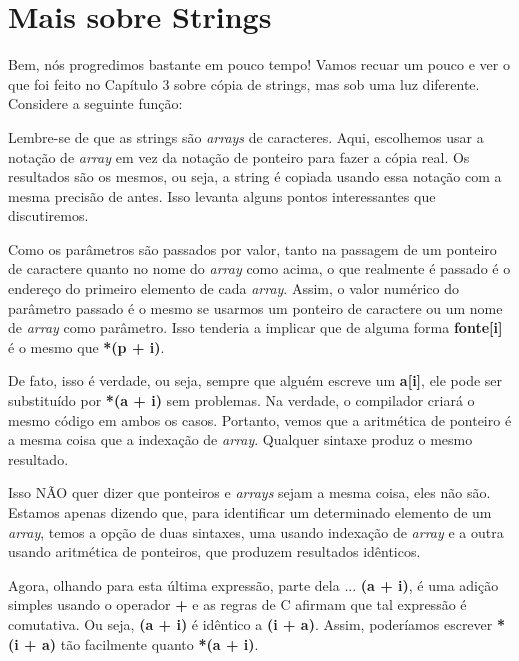 
\chapter{Mais sobre Strings}
Bem, nós progredimos bastante em pouco tempo! Vamos recuar um pouco e ver o que foi feito no Capítulo 3 sobre cópia de strings, mas sob uma luz diferente. Considere a seguinte função:


Lembre-se de que as strings são \textit{arrays} de caracteres. Aqui, escolhemos usar a notação de \textit{array} em vez da notação de ponteiro para fazer a cópia real. Os resultados são os mesmos, ou seja, a string é copiada usando essa notação com a mesma precisão de antes. Isso levanta alguns pontos interessantes que discutiremos.

Como os parâmetros são passados por valor, tanto na passagem de um ponteiro de caractere quanto no nome do \textit{array} como acima, o que realmente é passado é o endereço do primeiro elemento de cada \textit{array}. Assim, o valor numérico do parâmetro passado é o mesmo se usarmos um ponteiro de caractere ou um nome de \textit{array} como parâmetro. Isso tenderia a implicar que de alguma forma \textbf{fonte[i]} é o mesmo que \textbf{*(p + i)}.

De fato, isso é verdade, ou seja, sempre que alguém escreve um \textbf{a[i]}, ele pode ser substituído por \textbf{*(a + i)} sem problemas. Na verdade, o compilador criará o mesmo código em ambos os casos. Portanto, vemos que a aritmética de ponteiro é a mesma coisa que a indexação de \textit{array}. Qualquer sintaxe produz o mesmo resultado.

Isso NÃO quer dizer que ponteiros e \textit{arrays} sejam a mesma coisa, eles não são. Estamos apenas dizendo que, para identificar um determinado elemento de um \textit{array}, temos a opção de duas sintaxes, uma usando indexação de \textit{array} e a outra usando aritmética de ponteiros, que produzem resultados idênticos.

Agora, olhando para esta última expressão, parte dela ... \textbf{(a + i)}, é uma adição simples usando o operador \textbf{+} e as regras de C afirmam que tal expressão é comutativa. Ou seja, \textbf{(a + i)} é idêntico a \textbf{(i + a)}. Assim, poderíamos escrever \textbf{*(i + a)} tão facilmente quanto \textbf{*(a + i)}.

